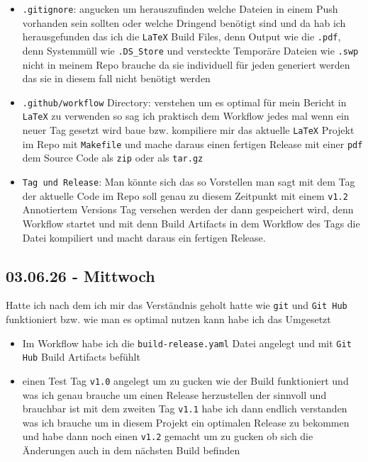 {\begin{itemize}[topsep=0pt,itemsep=0pt,parsep=0pt,leftmargin=1.5em]
  \item \texttt{.gitignore}: angucken um herauszufinden welche Dateien in einem Push vorhanden sein sollten oder welche Dringend benötigt sind und da hab ich herausgefunden das ich die \texttt{LaTeX} Build Files, denn Output wie die \texttt{.pdf}, denn Systemmüll wie \texttt{.DS\_Store} und versteckte Temporäre Dateien wie \texttt{.swp} nicht in meinem Repo brauche da sie individuell für jeden generiert werden das sie in diesem fall nicht benötigt werden
  \item \texttt{.github/workflow} Directory: verstehen um es optimal für mein Bericht in \texttt{LaTeX} zu verwenden so sag ich praktisch dem Workflow jedes mal wenn ein neuer Tag gesetzt wird baue bzw. kompiliere mir das aktuelle \texttt{LaTeX} Projekt im Repo mit \texttt{Makefile} und mache daraus einen fertigen Release mit einer \texttt{pdf} dem Source Code als \texttt{zip} oder als \texttt{tar.gz}
  \item \texttt{Tag und Release}: Man könnte sich das so Vorstellen man sagt mit dem Tag der aktuelle Code im Repo soll genau zu diesem Zeitpunkt mit einem \texttt{v1.2} Annotiertem Versions Tag versehen werden der dann gespeichert wird, denn Workflow startet und mit denn Build Artifacts in dem Workflow des Tags die Datei kompiliert und macht daraus ein fertigen Release.
\end{itemize}


\subsection{03.06.26 - Mittwoch}


Hatte ich nach dem ich mir das Verständnis geholt hatte wie \texttt{git} und \texttt{Git Hub} funktioniert bzw. wie man es optimal nutzen kann habe ich das Umgesetzt

\begin{itemize}[topsep=0pt,itemsep=0pt,parsep=0pt,leftmargin=1.5em]
  \item Im Workflow habe ich die \texttt{build-release.yaml} Datei angelegt und mit \texttt{Git Hub} Build Artifacts befühlt
  \item einen Test Tag \texttt{v1.0} angelegt um zu gucken wie der Build funktioniert und was ich genau brauche um einen Release herzustellen der sinnvoll und brauchbar ist mit dem zweiten Tag \texttt{v1.1} habe ich dann endlich verstanden was ich brauche um in diesem Projekt ein optimalen Release zu bekommen und habe dann noch einen \texttt{v1.2} gemacht um zu gucken ob sich die Änderungen auch in dem nächsten Build befinden
\end{itemize}

}
